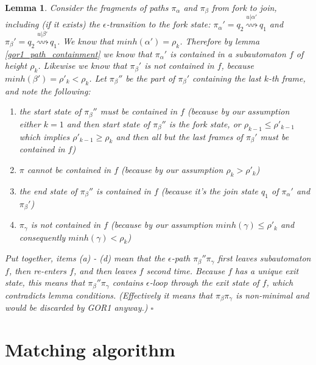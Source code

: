 \documentclass[AMA,STIX1COL]{WileyNJD-v2}
\newtheorem{XLem}{Lemma}
\begin{document}
\begin{XLem}
    Consider the fragments of paths $\pi_\alpha$ and $\pi_\beta$ from fork to join,
    including (if it exists) the $\epsilon$-transition to the fork state:
    $\pi_\alpha' = q_2 \overset {u | \alpha'} {\rightsquigarrow} q_1$ and
    $\pi_\beta' = q_2 \overset {u | \beta'} {\rightsquigarrow} q_1$.
    We know that $minh (\alpha') = \rho_k$.
    Therefore by lemma \ref{gor1_path_containment}
    we know that $\pi_\alpha'$ is contained in a subautomaton $f$ of height $\rho_k$.
    Likewise we know that $\pi_\beta'$ is not contained in $f$, because $minh (\beta') = \rho'_k < \rho_k$.
    Let $\pi_\beta''$ be the part of $\pi_\beta'$ containing the last $k$-th frame,
    and note the following:
    \begin{enumerate}
        \item[(a)] the start state of $\pi_\beta''$ must be contained in $f$
            (because by our assumption
            either $k = 1$ and then start state of $\pi_\beta''$ is the fork state,
            or $\rho_{k-1} \leq \rho'_{k-1}$ which implies $\rho'_{k-1} \geq \rho_k$
            and then all but the last frames of $\pi_\beta'$ must be contained in $f$)
        \item[(b)] $\pi$ cannot be contained in $f$
            (because by our assumption $\rho_k > \rho'_k$)
        \item[(c)] the end state of $\pi_\beta''$ is contained in $f$
            (because it's the join state $q_1$ of $\pi_\alpha'$ and $\pi_\beta'$)
        \item[(d)] $\pi_\gamma$ is not contained in $f$
            (because by our assumption $minh (\gamma) \leq \rho'_k$ and consequently $minh (\gamma) < \rho_k$)
    \end{enumerate}
    Put together, items (a) - (d) mean that the $\epsilon$-path $\pi_\beta'' \pi_\gamma$
    first leaves subautomaton $f$, then re-enters $f$, and then leaves $f$ second time.
    Because $f$ has a unique exit state, this means that $\pi_\beta'' \pi_\gamma$ contains $\epsilon$-loop
    through the exit state of $f$, which contradicts lemma conditions.
    (Effectively it means that $\pi_\beta \pi_\gamma$ is non-minimal and would be discarded by GOR1 anyway.)
    $\square$
    \end{XLem}




\section{Matching algorithm}
\end{document}
